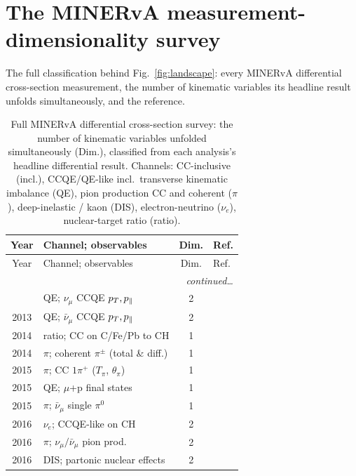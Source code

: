 \section{The MINERvA measurement-dimensionality survey}
\label{app:landscape}

The full classification behind Fig.~\ref{fig:landscape}: every MINERvA
differential cross-section measurement, the number of kinematic variables its
headline result unfolds simultaneously, and the reference.

{\small
\begin{longtable}{@{}clcl@{}}
  \caption{Full MINERvA differential cross-section survey: the number of
  kinematic variables unfolded simultaneously (Dim.), classified from each
  analysis's headline differential result. Channels: CC-inclusive (incl.),
  CCQE/QE-like incl.\ transverse kinematic imbalance (QE), pion production CC
  and coherent ($\pi$), deep-inelastic / kaon (DIS), electron-neutrino
  ($\nu_e$), nuclear-target ratio (ratio).}
  \label{tab:landscape}\\
  \toprule
  Year & Channel; observables & Dim. & Ref. \\
  \midrule
  \endfirsthead
  \toprule
  Year & Channel; observables & Dim. & Ref. \\
  \midrule
  \endhead
  \midrule \multicolumn{4}{r}{\emph{continued\ldots}}\\ \endfoot
  \bottomrule
  \endlastfoot
  2013 & QE; $\nu_\mu$ CCQE $p_{T},p_{\parallel}$            & 2 & \cite{MINERvA:2013qe} \\
  2013 & QE; $\bar\nu_\mu$ CCQE $p_{T},p_{\parallel}$        & 2 & \cite{MINERvA:2013qebar} \\
  2014 & ratio; CC on C/Fe/Pb to CH               & 1 & \cite{MINERvA:2014ratio} \\
  2014 & $\pi$; coherent $\pi^\pm$ (total \& diff.) & 1 & \cite{MINERvA:2014coh} \\
  2015 & $\pi$; CC $1\pi^+$ ($T_\pi$, $\theta_\pi$) & 1 & \cite{MINERvA:2015ydy} \\
  2015 & QE; $\mu$+p final states                 & 1 & \cite{MINERvA:2015mup} \\
  2015 & $\pi$; $\bar\nu_\mu$ single $\pi^0$       & 1 & \cite{MINERvA:2015pi0} \\
  2016 & $\nu_e$; CCQE-like on CH                  & 2 & \cite{MINERvA:2016nueqe} \\
  2016 & $\pi$; $\nu_\mu/\bar\nu_\mu$ pion prod.   & 2 & \cite{MINERvA:2016pion} \\
  2016 & DIS; partonic nuclear effects            & 2 & \cite{MINERvA:2016dis} \\

\end{longtable}}
